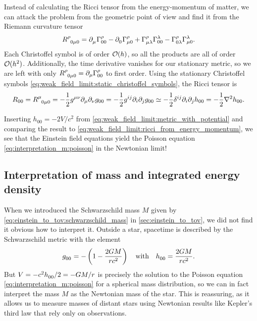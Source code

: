 Instead of calculating the Ricci tensor from the energy-momentum of matter, we can attack the problem from the geometric point of view and find it from the Riemann curvature tensor
\begin{equation}
	R\indices{^\rho_0_\mu_0} =
	\partial\indices{_\mu} \Gamma^\rho_{0 0} -
	\partial\indices{_0} \Gamma^{\rho}_{\mu 0} +
	\Gamma^\rho_{\mu \lambda} \Gamma^{\lambda}_{0 0} -
	\Gamma^\rho_{0 \lambda} \Gamma^{\lambda}_{\mu 0} .
\end{equation}
Each Christoffel symbol is of order $\mathcal{O}(h)$, so all the products are all of order $\mathcal{O}(h^2)$.
Additionally, the time derivative vanishes for our stationary metric, so we are left with only $R\indices{^\rho_0_\mu_0} = \partial_\mu \Gamma^\rho_{00}$ to first order.
Using the stationary Christoffel symbols \eqref{eq:weak_field_limit:static_christoffel_symbols}, the Ricci tensor is
\begin{equation}
	R_{00} =       R\indices{^\mu_{0 \mu 0}}
		   =       -\frac12 g^{\mu \nu} \partial_\mu \partial_\nu g_{00}
		   =       -\frac12 g^{i j} \partial_i \partial_j g_{00}
		   \taylor -\frac12 \delta^{i j} \partial_i \partial_j h_{00}
		   =       -\frac12 \nabla^2 h_{00} .
	\label{eq:weak_field_limit:ricci_from_riemann}
\end{equation}

Inserting $h_{00} = -2V/c^2$ from \cref{eq:weak_field_limit:metric_with_potential} and comparing the result to \cref{eq:weak_field_limit:ricci_from_energy_momentum}, we see that the Einstein field equations yield the Poisson equation \eqref{eq:interpretation_m:poisson} in the Newtonian limit!

\subsection{Interpretation of mass and integrated energy density}

When we introduced the Schwarzschild mass $M$ given by \cref{eq:einstein_to_tov:schwarzschild_mass} in \cref{sec:einstein_to_tov}, we did not find it obvious how to interpret it.
Outside a star, spacetime is described by the Schwarzschild metric with the element \cite[equation 5.1]{ref:carroll}
\begin{equation}
	g\indices{_0_0} = - \left( 1 - \frac{2 G M}{r c^2} \right)
	\quad \text{with} \quad
	h\indices{_0_0} = \frac{2GM}{rc^2} .
	\label{eq:weak_field_limit:schwarzschild_metric_tt}
\end{equation}
But $V = -c^2 h\indices{_0_0} / 2 = -G M / r$ is precisely the solution to the Poisson equation \eqref{eq:interpretation_m:poisson} for a spherical mass distribution, so we can in fact interpret the mass $M$ as the Newtonian mass of the star.
This is reassuring, as it allows us to measure masses of distant stars using Newtonian results like Kepler's third law \cite[chapter 19]{ref:mtw} that rely only on observations.

